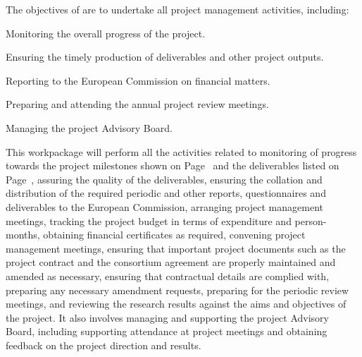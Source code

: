 \addtocounter{wpno}{1}

\begin{Workpackage}{\thewpno}
\WPTitle{\wpname{\thewpno}}


\begin{WPObjectives}
The objectives of \theWP{} are to undertake all project management activities, including:
\begin{compactitem}
\item
Monitoring the overall progress of the project.
\item
Ensuring the timely production of deliverables and other project outputs.
\item
Reporting to the European Commission on financial matters.
\item
Preparing and attending the annual project review meetings.

\item
Managing the project Advisory Board.
\end{compactitem}
\end{WPObjectives}

\begin{WPDescription}
This workpackage will perform all the activities related to monitoring
of progress towards the project milestones shown on Page~\pageref{sect:milestones}
and the deliverables listed on Page~\pageref{sect:deliverables},
assuring the quality of the deliverables, ensuring the
collation and distribution of the required periodic and other reports,
questionnaires and deliverables to
the European Commission, arranging project management meetings, tracking
the project budget in terms of expenditure and person-months,
obtaining financial certificates as required, convening project
management meetings, ensuring that important project documents
such as the project contract and the consortium agreement are
properly maintained and amended as necessary, ensuring that
contractual details are complied with, preparing any necessary amendment requests,
preparing for the periodic review meetings, and reviewing the research
results against the aims and objectives of the project.
It also involves managing and supporting the project
Advisory Board, including supporting attendance at project
meetings and obtaining feedback on the project direction and
results.
\end{WPDescription}


\end{Workpackage}
